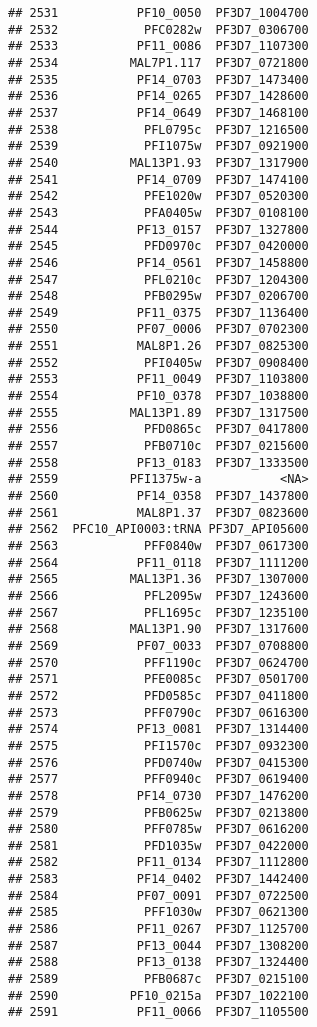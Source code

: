 \documentclass[12pt, a4paper]{article}\usepackage[]{graphicx}\usepackage[]{color}
\makeatletter
\newenvironment{kframe}{%
 \def\at@end@of@kframe{}%
 \ifinner\ifhmode%
  \def\at@end@of@kframe{\end{minipage}}%
  \begin{minipage}{\columnwidth}%
 \fi\fi%
 \def\FrameCommand##1{\hskip\@totalleftmargin \hskip-\fboxsep
 \colorbox{shadecolor}{##1}\hskip-\fboxsep
     \hskip-\linewidth \hskip-\@totalleftmargin \hskip\columnwidth}%
 \MakeFramed {\advance\hsize-\width
   \@totalleftmargin\z@ \linewidth\hsize
   \@setminipage}}%
 {\par\unskip\endMakeFramed%
 \at@end@of@kframe}
\newenvironment{knitrout}{}{} %
\makeatother
\begin{document}
\begin{knitrout}
\begin{kframe}
\begin{verbatim}
## 2531           PF10_0050  PF3D7_1004700
## 2532            PFC0282w  PF3D7_0306700
## 2533           PF11_0086  PF3D7_1107300
## 2534          MAL7P1.117  PF3D7_0721800
## 2535           PF14_0703  PF3D7_1473400
## 2536           PF14_0265  PF3D7_1428600
## 2537           PF14_0649  PF3D7_1468100
## 2538            PFL0795c  PF3D7_1216500
## 2539            PFI1075w  PF3D7_0921900
## 2540          MAL13P1.93  PF3D7_1317900
## 2541           PF14_0709  PF3D7_1474100
## 2542            PFE1020w  PF3D7_0520300
## 2543            PFA0405w  PF3D7_0108100
## 2544           PF13_0157  PF3D7_1327800
## 2545            PFD0970c  PF3D7_0420000
## 2546           PF14_0561  PF3D7_1458800
## 2547            PFL0210c  PF3D7_1204300
## 2548            PFB0295w  PF3D7_0206700
## 2549           PF11_0375  PF3D7_1136400
## 2550           PF07_0006  PF3D7_0702300
## 2551           MAL8P1.26  PF3D7_0825300
## 2552            PFI0405w  PF3D7_0908400
## 2553           PF11_0049  PF3D7_1103800
## 2554           PF10_0378  PF3D7_1038800
## 2555          MAL13P1.89  PF3D7_1317500
## 2556            PFD0865c  PF3D7_0417800
## 2557            PFB0710c  PF3D7_0215600
## 2558           PF13_0183  PF3D7_1333500
## 2559          PFI1375w-a           <NA>
## 2560           PF14_0358  PF3D7_1437800
## 2561           MAL8P1.37  PF3D7_0823600
## 2562  PFC10_API0003:tRNA PF3D7_API05600
## 2563            PFF0840w  PF3D7_0617300
## 2564           PF11_0118  PF3D7_1111200
## 2565          MAL13P1.36  PF3D7_1307000
## 2566            PFL2095w  PF3D7_1243600
## 2567            PFL1695c  PF3D7_1235100
## 2568          MAL13P1.90  PF3D7_1317600
## 2569           PF07_0033  PF3D7_0708800
## 2570            PFF1190c  PF3D7_0624700
## 2571            PFE0085c  PF3D7_0501700
## 2572            PFD0585c  PF3D7_0411800
## 2573            PFF0790c  PF3D7_0616300
## 2574           PF13_0081  PF3D7_1314400
## 2575            PFI1570c  PF3D7_0932300
## 2576            PFD0740w  PF3D7_0415300
## 2577            PFF0940c  PF3D7_0619400
## 2578           PF14_0730  PF3D7_1476200
## 2579            PFB0625w  PF3D7_0213800
## 2580            PFF0785w  PF3D7_0616200
## 2581            PFD1035w  PF3D7_0422000
## 2582           PF11_0134  PF3D7_1112800
## 2583           PF14_0402  PF3D7_1442400
## 2584           PF07_0091  PF3D7_0722500
## 2585            PFF1030w  PF3D7_0621300
## 2586           PF11_0267  PF3D7_1125700
## 2587           PF13_0044  PF3D7_1308200
## 2588           PF13_0138  PF3D7_1324400
## 2589            PFB0687c  PF3D7_0215100
## 2590          PF10_0215a  PF3D7_1022100
## 2591           PF11_0066  PF3D7_1105500

\end{verbatim}
\end{kframe}
\end{knitrout}
\end{document}
